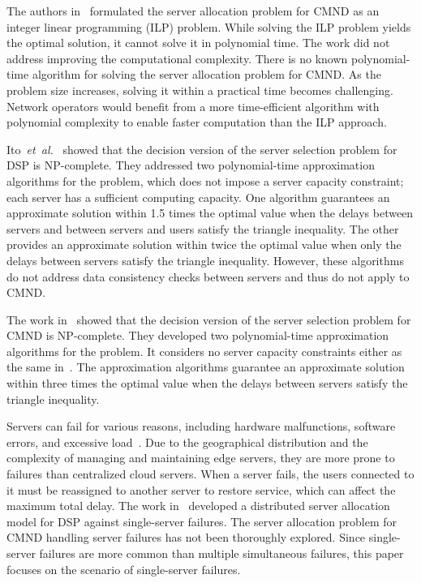 \documentclass[10pt, letterpaper]{IEEEtran}
\begin{document}
\begin{CJK}{UTF8}{ipxm}
The authors in~\cite{KawabataICC2023,CMND} formulated the server allocation problem for CMND as an integer linear programming (ILP) problem. 
While solving the ILP problem yields the optimal solution, it cannot solve it in polynomial time.
The work did not address improving the computational complexity. 
There is no known polynomial-time algorithm for solving the server allocation problem for CMND. 
As the problem size increases, solving it within a practical time becomes challenging. 
Network operators would benefit from a more time-efficient algorithm with polynomial complexity to enable faster computation than the ILP approach.

Ito~{\it et~al.}~\cite{3Ito2018} showed that the decision version of the server selection problem for DSP is NP-complete.
They addressed two polynomial-time approximation algorithms for the problem, which does not impose a server capacity constraint; each server has a sufficient computing capacity.
One algorithm guarantees an approximate solution within 1.5 times the optimal value when the delays between servers and between servers and users satisfy the triangle inequality.
The other provides an approximate solution within twice the optimal value when only the delays between servers satisfy the triangle inequality. However, these algorithms do not address data consistency checks between servers and thus do not apply to CMND.

The work in~\cite{Oda_CMND2025} showed that the decision version of the server selection problem for CMND is NP-complete.
They developed two polynomial-time approximation algorithms for the problem. It considers no server capacity constraints either as the same in~\cite{3Ito2018}.
The approximation algorithms guarantee an approximate solution within three times the optimal value when the delays between servers satisfy the triangle inequality.

Servers can fail for various reasons, including hardware malfunctions, software errors, and excessive load~\cite{5_9_8_Shi2016}. 
Due to the geographical distribution and the complexity of managing and maintaining edge servers, they are more prone to failures than centralized cloud servers.
When a server fails, the users connected to it must be reassigned to another server to restore service, which can affect the maximum total delay.
The work in~\cite{5_9_Masuda2020} developed a distributed server allocation model for DSP against single-server failures. %
The server allocation problem for CMND handling server failures has not been thoroughly explored.
Since single-server failures are more common than multiple simultaneous failures, this paper focuses on the scenario of single-server failures.


\end{CJK}
\end{document}
